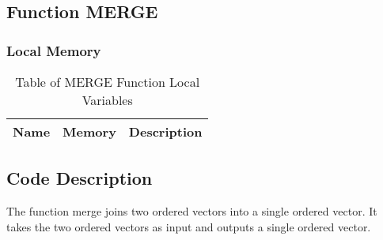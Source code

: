 \documentclass[oneside,12pt]{book}
\begin{document}
\subsection{Function MERGE}
\subsubsection*{Local Memory}
\begin{center}
\begin{table}[ht]
\begin{tabular}{|c|c|p{5in}|}
\hline
\textbf{Name} & \textbf{Memory} & \textbf{Description}\\
\hline
\end{tabular}
\caption{Table of MERGE Function Local Variables}
\end{table}
\end{center}
\subsection{Code Description}
The function merge joins two ordered vectors into a single ordered vector.  It takes the two ordered vectors as input and outputs a single ordered vector.

\newpage
\end{document}
